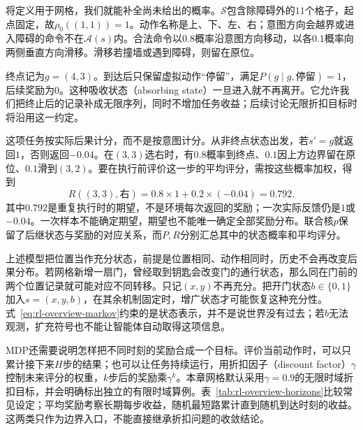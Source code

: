 将定义用于网格，我们就能补全尚未给出的概率。$\mathcal S$包含除障碍外的$11$个格子，起点固定，故$\rho_0((1,1))=1$。动作名称是上、下、左、右；意图方向会越界或进入障碍的命令不在$\mathcal A(s)$内。合法命令以$0.8$概率沿意图方向移动，以各$0.1$概率向两侧垂直方向滑移。滑移若撞墙或遇到障碍，则留在原位。

终点记为$g=(4,3)$。到达后只保留虚拟动作“停留”，满足$P(g\mid g,\text{停留})=1$，后续奖励为$0$。这种吸收状态（absorbing state）一旦进入就不再离开。它允许我们把终止后的记录补成无限序列，同时不增加任务收益；后续讨论无限折扣目标时将沿用这一约定。

这项任务按实际后果计分，而不是按意图计分。从非终点状态出发，若$s'=g$就返回$1$，否则返回$-0.04$。在$(3,3)$选右时，有$0.8$概率到终点、$0.1$因上方边界留在原位、$0.1$滑到$(3,2)$。要在执行前评价这一步的平均评分，需按这些概率加权，得到
\[
  R((3,3),\text{右})=0.8\times1+0.2\times(-0.04)=0.792.
\]
其中$0.792$是重复执行时的期望，不是环境每次返回的奖励；一次实际反馈仍是$1$或$-0.04$。一次样本不能确定期望，期望也不能唯一确定全部奖励分布。联合核$p$保留了后继状态与奖励的对应关系，而$P,R$分别汇总其中的状态概率和平均评分。

上述模型把位置当作充分状态，前提是位置相同、动作相同时，历史不会再改变后果分布。若网格新增一扇门，曾经取到钥匙会改变门的通行状态，那么同在门前的两个位置记录就可能对应不同转移。只记$(x,y)$不再充分。把开门状态$b\in\{0,1\}$加入$s=(x,y,b)$，在其余机制固定时，增广状态才可能恢复这种充分性。式~\eqref{eq:rl-overview-markov}约束的是状态表示，并不是说世界没有过去；若$b$无法观测，扩充符号也不能让智能体自动取得这项信息。

MDP还需要说明怎样把不同时刻的奖励合成一个目标。评价当前动作时，可以只累计接下来$H$步的结果；也可以让任务持续运行，用折扣因子（discount factor）$\gamma$控制未来评分的权重，$k$步后的奖励乘$\gamma^k$。本章网格默认采用$\gamma=0.9$的无限时域折扣目标，并会明确标出独立的有限时域算例。表~\ref{tab:rl-overview-horizons}比较常见设定；平均奖励考察长期每步收益，随机最短路累计直到随机到达时刻的收益。这两类只作为边界入口，不能直接继承折扣问题的收敛结论。

